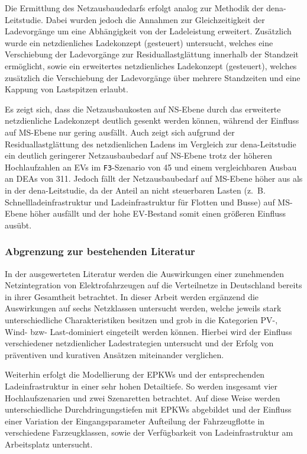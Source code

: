 Die Ermittlung des Netzausbaudedarfs erfolgt analog zur Methodik der dena-Leitstudie.
Dabei wurden jedoch die Annahmen zur Gleichzeitigkeit der Ladevorgänge um eine Abhängigkeit von der Ladeleistung erweitert.
Zusätzlich wurde ein netzdienliches Ladekonzept (gesteuert) untersucht, welches eine Verschiebung der Ladevorgänge zur Residuallastglättung innerhalb der Standzeit ermöglicht, sowie ein erweitertes netzdienliches Ladekonzept (gesteuert\Plus), welches zusätzlich die Verschiebung der Ladevorgänge über mehrere Standzeiten und eine Kappung von Lastspitzen erlaubt.\medskip

Es zeigt sich, dass die Netzausbaukosten auf \gls{NS}-Ebene durch das erweiterte netzdienliche Ladekonzept deutlich gesenkt werden können, während der Einfluss auf \gls{MS}-Ebene nur gering ausfällt.
Auch zeigt sich aufgrund der Residuallastglättung des netzdienlichen Ladens im Vergleich zur dena-Leitstudie ein deutlich geringerer Netzausbaubedarf auf \gls{NS}-Ebene trotz der höheren Hochlaufzahlen an \glspl{EV} im \texttt{F3}-Szenario von \SI{45}{\MioStk} und einem vergleichbaren Ausbau an \glspl{DEA} von \SI{311}{\gw}.
Jedoch fällt der Netzausbaubedarf auf \gls{MS}-Ebene höher aus als in der dena-Leitstudie, da der Anteil an nicht steuerbaren Lasten (z.~B. Schnellladeinfrastruktur und Ladeinfrastruktur für Flotten und Busse) auf \gls{MS}-Ebene höher ausfällt und der hohe \gls{EV}-Bestand somit einen größeren Einfluss ausübt.


\subsubsection{Abgrenzung zur bestehenden Literatur}

In der ausgewerteten Literatur werden die Auswirkungen einer zunehmenden Netzintegration von Elektrofahrzeugen auf die Verteilnetze in Deutschland bereits in ihrer Gesamtheit betrachtet.
In dieser Arbeit werden ergänzend die Auswirkungen auf sechs Netzklassen untersucht werden, welche jeweils stark unterschiedliche Charakteristiken besitzen und grob in die Kategorien \gls{PV}-, Wind- bzw- Last-dominiert eingeteilt werden können.
Hierbei wird der Einfluss verschiedener netzdienlicher Ladestrategien untersucht und der Erfolg von präventiven und kurativen Ansätzen miteinander verglichen.\medskip

Weiterhin erfolgt die Modellierung der \glspl{EPKW} und der entsprechenden Ladeinfrastruktur in einer sehr hohen Detailtiefe.
So werden insgesamt vier Hochlaufszenarien und zwei Szenaretten betrachtet.
Auf diese Weise werden unterschiedliche Durchdringungstiefen mit \glspl{EPKW} abgebildet und der Einfluss einer Variation der Eingangsparameter Aufteilung der Fahrzeugflotte in verschiedene Farzeugklassen, sowie der Verfügbarkeit von Ladeinfrastruktur am Arbeitsplatz untersucht.


